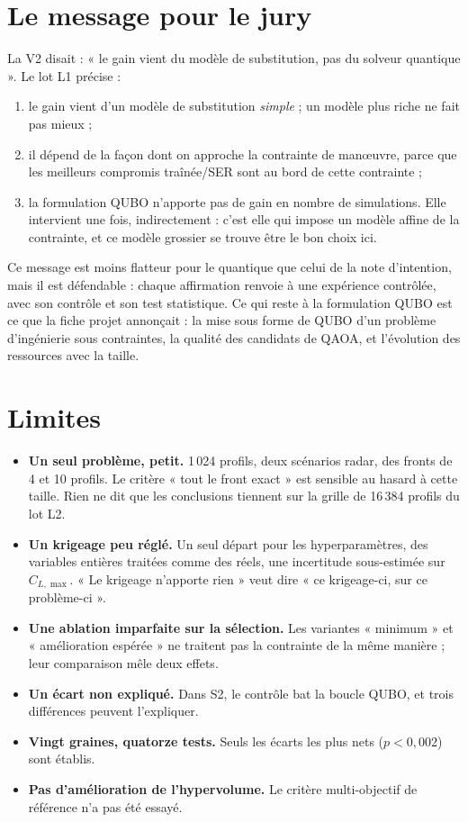 \section{Le message pour le jury}
La V2 disait : « le gain vient du modèle de substitution, pas du solveur quantique ». Le lot L1 précise :
\begin{enumerate}
\item le gain vient d'un modèle de substitution \emph{simple} ; un modèle plus riche ne fait pas mieux ;
\item il dépend de la façon dont on approche la contrainte de manœuvre, parce que les meilleurs compromis traînée/SER sont au bord de cette contrainte ;
\item la formulation QUBO n'apporte pas de gain en nombre de simulations. Elle intervient une fois, indirectement : c'est elle qui impose un modèle affine de la contrainte, et ce modèle grossier se trouve être le bon choix ici.
\end{enumerate}
Ce message est moins flatteur pour le quantique que celui de la note d'intention, mais il est défendable : chaque affirmation renvoie à une expérience contrôlée, avec son contrôle et son test statistique. Ce qui reste à la formulation QUBO est ce que la fiche projet annonçait : la mise sous forme de QUBO d'un problème d'ingénierie sous contraintes, la qualité des candidats de QAOA, et l'évolution des ressources avec la taille.

\section{Limites}
\begin{itemize}
\item \textbf{Un seul problème, petit.} 1\,024 profils, deux scénarios radar, des fronts de 4 et 10 profils. Le critère « tout le front exact » est sensible au hasard à cette taille. Rien ne dit que les conclusions tiennent sur la grille de 16\,384 profils du lot L2.
\item \textbf{Un krigeage peu réglé.} Un seul départ pour les hyperparamètres, des variables entières traitées comme des réels, une incertitude sous-estimée sur $C_{L,\max}$. « Le krigeage n'apporte rien » veut dire « ce krigeage-ci, sur ce problème-ci ».
\item \textbf{Une ablation imparfaite sur la sélection.} Les variantes « minimum » et « amélioration espérée » ne traitent pas la contrainte de la même manière ; leur comparaison mêle deux effets.
\item \textbf{Un écart non expliqué.} Dans S2, le contrôle bat la boucle QUBO, et trois différences peuvent l'expliquer.
\item \textbf{Vingt graines, quatorze tests.} Seuls les écarts les plus nets ($p<0{,}002$) sont établis.
\item \textbf{Pas d'amélioration de l'hypervolume.} Le critère multi-objectif de référence n'a pas été essayé.
\end{itemize}

